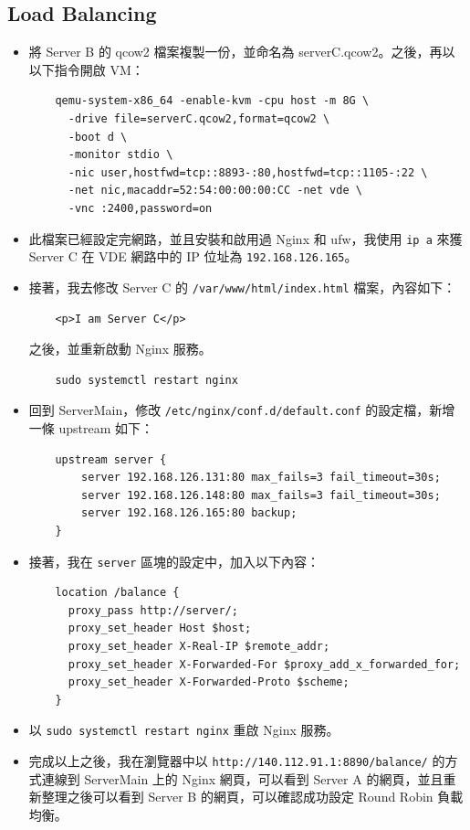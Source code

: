 \documentclass[12pt]{article}
\begin{document}
\subsection{Load Balancing}
\begin{itemize}
  \item 將 Server B 的 qcow2 檔案複製一份，並命名為 serverC.qcow2。之後，再以以下指令開啟 VM：
  \begin{verbatim}
    qemu-system-x86_64 -enable-kvm -cpu host -m 8G \
      -drive file=serverC.qcow2,format=qcow2 \
      -boot d \
      -monitor stdio \
      -nic user,hostfwd=tcp::8893-:80,hostfwd=tcp::1105-:22 \
      -net nic,macaddr=52:54:00:00:00:CC -net vde \
      -vnc :2400,password=on
  \end{verbatim}
  \item 此檔案已經設定完網路，並且安裝和啟用過 Nginx 和 ufw，我使用 \texttt{ip a} 來獲 Server C 在 VDE 網路中的 IP 位址為 \texttt{192.168.126.165}。
  \item 接著，我去修改 Server C 的 \texttt{/var/www/html/index.html} 檔案，內容如下：
  \begin{verbatim}
    <p>I am Server C</p>
  \end{verbatim}
  之後，並重新啟動 Nginx 服務。
  \begin{verbatim}
    sudo systemctl restart nginx
  \end{verbatim}
  \item 回到 ServerMain，修改 \texttt{/etc/nginx/conf.d/default.conf} 的設定檔，新增一條 upstream 如下：
  \begin{verbatim}
    upstream server {
        server 192.168.126.131:80 max_fails=3 fail_timeout=30s;
        server 192.168.126.148:80 max_fails=3 fail_timeout=30s;
        server 192.168.126.165:80 backup;
    }
  \end{verbatim}
  \item 接著，我在 \texttt{server} 區塊的設定中，加入以下內容：
  \begin{verbatim}
    location /balance {
      proxy_pass http://server/;
      proxy_set_header Host $host;
      proxy_set_header X-Real-IP $remote_addr;
      proxy_set_header X-Forwarded-For $proxy_add_x_forwarded_for;
      proxy_set_header X-Forwarded-Proto $scheme;
    }
  \end{verbatim}
  \item 以 \texttt{sudo systemctl restart nginx} 重啟 Nginx 服務。
  \item 完成以上之後，我在瀏覽器中以 \texttt{http://140.112.91.1:8890/balance/} 的方式連線到 ServerMain 上的 Nginx 網頁，可以看到 Server A 的網頁，並且重新整理之後可以看到 Server B 的網頁，可以確認成功設定 Round Robin 負載均衡。

\end{itemize}
\end{document}
